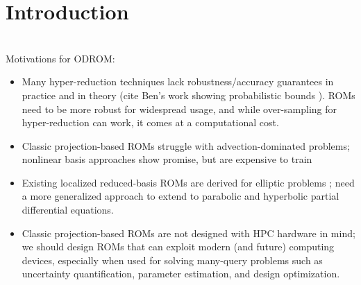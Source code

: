 
\section{Introduction} \label{sec:intro}

 \\

Motivations for ODROM: 

\begin{itemize}
\item Many hyper-reduction techniques lack robustness/accuracy guarantees in practice and in theory (cite Ben's work showing probabilistic bounds \cite{peherstorfer2020stability}). ROMs need to be more robust for widespread usage, and while over-sampling for hyper-reduction can work, it comes at a computational cost. 
\item Classic projection-based ROMs struggle with advection-dominated problems; nonlinear basis approaches show promise, but are expensive to train
\item Existing localized reduced-basis ROMs are derived for elliptic problems \cite{ohlberger2015error,antonietti2016discontinuous}; need a more generalized approach to extend to parabolic and hyperbolic partial differential equations. 
\item Classic projection-based ROMs are not designed with HPC hardware in mind; we should design ROMs that can exploit modern (and future) computing devices, especially when used for solving many-query problems such as uncertainty quantification, parameter estimation, and design optimization. 
\end{itemize}

 \\

